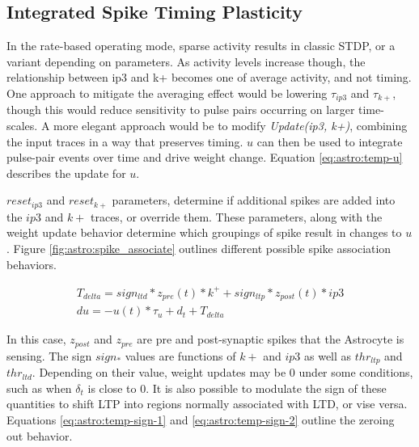     
    
 
    \subsection{Integrated Spike Timing Plasticity}
    
    In the rate-based operating mode, sparse activity results in classic STDP,
    or a variant depending on parameters. As activity levels increase though,
    the relationship between ip3 and k+ becomes one of average activity, and not
    timing. One approach to mitigate the averaging effect would be lowering
    $\tau_{ip3}$ and $\tau_{k+}$, though this would reduce sensitivity to pulse
    pairs occurring on larger time-scales. A more elegant approach would be to
    modify \emph{Update(ip3, k+)}, combining the input traces in a way that
    preserves timing. $u$ can then be used to integrate pulse-pair events over
    time and drive weight change. Equation \ref{eq:astro:temp-u} describes the
    update for $u$.

    $reset_{ip3}$ and $reset_{k+}$ parameters, determine if additional spikes
    are added into the $ip3$ and $k+$ traces, or override them. These
    parameters, along with the weight update behavior determine which groupings
    of spike result in changes to $u$. Figure \ref{fig:astro:spike_associate}
    outlines different possible spike association behaviors.


    \begin{align}
      T_{delta} = sign_{ltd} * z_{pre}(t) * k^+ + sign_{ltp} * z_{post}(t) * ip3 \\
      du = -u(t) * \tau_u + d_t + T_{delta} \label{eq:astro:temp-u}
    \end{align}

    In this case, $z_{post}$ and $z_{pre}$ are pre and post-synaptic spikes that
    the Astrocyte is sensing. The sign $sign_*$ values are functions of $k+$ and
    $ip3$ as well as $thr_{ltp}$ and $thr_{ltd}$. Depending on their value,
    weight updates may be 0 under some conditions, such as when $\delta_t$ is
    close to 0. It is also possible to modulate the sign of these quantities to
    shift LTP into regions normally associated with LTD, or vise
    versa. Equations \ref{eq:astro:temp-sign-1} and \ref{eq:astro:temp-sign-2}
    outline the zeroing out behavior.

